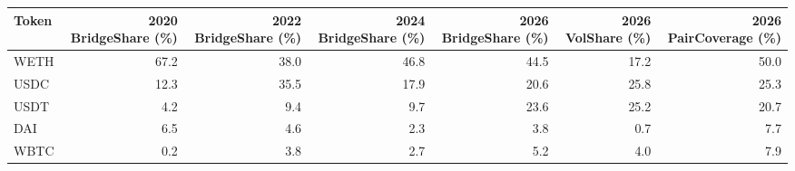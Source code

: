 \begin{tabular}{lrrrrrr}
\toprule
Token & 2020 BridgeShare (\%) & 2022 BridgeShare (\%) & 2024 BridgeShare (\%) & 2026 BridgeShare (\%) & 2026 VolShare (\%) & 2026 PairCoverage (\%) \\
\midrule
WETH & 67.2 & 38.0 & 46.8 & 44.5 & 17.2 & 50.0 \\
USDC & 12.3 & 35.5 & 17.9 & 20.6 & 25.8 & 25.3 \\
USDT & 4.2 & 9.4 & 9.7 & 23.6 & 25.2 & 20.7 \\
DAI & 6.5 & 4.6 & 2.3 & 3.8 & 0.7 & 7.7 \\
WBTC & 0.2 & 3.8 & 2.7 & 5.2 & 4.0 & 7.9 \\
\bottomrule
\end{tabular}
